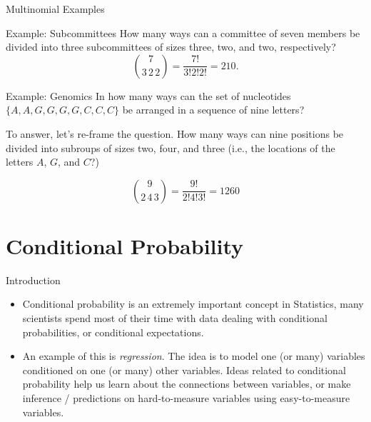 \begin{frame}[allowframebreaks]{Multinomial Examples}
  \begin{exampleblock}{Example: Subcommittees}
    How many ways can a committee of seven members be divided into three subcommittees of sizes three, two, and two, respectively?
    $$
    \binom{7}{3\,2\,2} = \frac{7!}{3!2!2!} = 210.
    $$
  \end{exampleblock}
  
  \begin{exampleblock}{Example: Genomics}
    In how many ways can the set of nucleotides $\{A, A, G, G, G, G, C, C, C\}$ be arranged in a sequence of nine letters? 
    
    To answer, let's re-frame the question. How many ways can nine positions be divided into subroups of sizes two, four, and three (i.e., the locations of the letters $A$, $G$, and $C$?)
    
    $$
    \binom{9}{2\,4\,3} = \frac{9!}{2!4!3!} = 1260
    $$
  \end{exampleblock}
  
\end{frame}

\section{Conditional Probability}

\begin{frame}{Introduction}
    
  \begin{itemize}
    \item \alert{Conditional probability} is an extremely important concept in Statistics, many scientists spend most of their time with data dealing with conditional probabilities, or conditional expectations.
  
    \item An example of this is \emph{regression}.
  The idea is to model one (or many) variables conditioned on one (or many) other variables.
  Ideas related to conditional probability help us learn about the connections between variables, or make inference / predictions on hard-to-measure variables using easy-to-measure variables.
  \end{itemize}
  
\end{frame}

